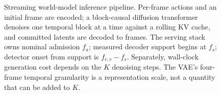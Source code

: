 \documentclass[11pt]{article}
\begin{document}
\begin{figure}[t]
{%
}
\caption{Streaming world-model inference pipeline. Per-frame actions and an initial frame are encoded; a block-causal diffusion transformer denoises one temporal block at a time against a rolling KV cache, and committed latents are decoded to frames. The serving stack owns nominal admission $f_a$; measured decoder support begins at $f_s$; detector onset from support is $f_{r,v}-f_s$. Separately, wall-clock generation cost depends on the $K$ denoising steps. The VAE's four-frame temporal granularity is a representation scale, not a quantity that can be added to $K$.}
\label{fig:pipeline}
\end{figure}
\end{document}
